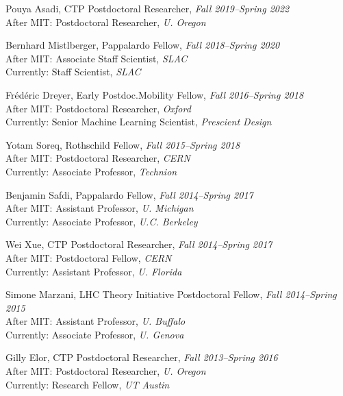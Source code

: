 \item Pouya Asadi, CTP Postdoctoral Researcher, \emph{Fall 2019--Spring 2022}
\\ After MIT: Postdoctoral Researcher, \emph{U. Oregon}

\item Bernhard Mistlberger, Pappalardo Fellow, \emph{Fall 2018--Spring 2020}
\\ After MIT: Associate Staff Scientist, \emph{SLAC}
\\ Currently: Staff Scientist, \emph{SLAC}

\item Frédéric Dreyer, Early Postdoc.Mobility Fellow, \emph{Fall 2016--Spring 2018}
\\ After MIT: Postdoctoral Researcher, \emph{Oxford}
\\ Currently: Senior Machine Learning Scientist, \emph{Prescient Design}

\item Yotam Soreq, Rothschild Fellow, \emph{Fall 2015--Spring 2018}
\\ After MIT: Postdoctoral Researcher, \emph{CERN}
\\ Currently: Associate Professor, \emph{Technion}

\item Benjamin Safdi, Pappalardo Fellow, \emph{Fall 2014--Spring 2017}
\\ After MIT: Assistant Professor, \emph{U. Michigan}
\\ Currently: Associate Professor, \emph{U.C. Berkeley}

\item Wei Xue, CTP Postdoctoral Researcher, \emph{Fall 2014--Spring 2017}
\\ After MIT: Postdoctoral Fellow, \emph{CERN}
\\ Currently: Assistant Professor, \emph{U. Florida}

\item Simone Marzani, LHC Theory Initiative Postdoctoral Fellow, \emph{Fall 2014--Spring 2015}
\\ After MIT: Assistant Professor, \emph{U. Buffalo}
\\ Currently: Associate Professor, \emph{U. Genova}

\item Gilly Elor, CTP Postdoctoral Researcher, \emph{Fall 2013--Spring 2016}
\\ After MIT: Postdoctoral Researcher, \emph{U. Oregon}
\\ Currently: Research Fellow, \emph{UT Austin}

